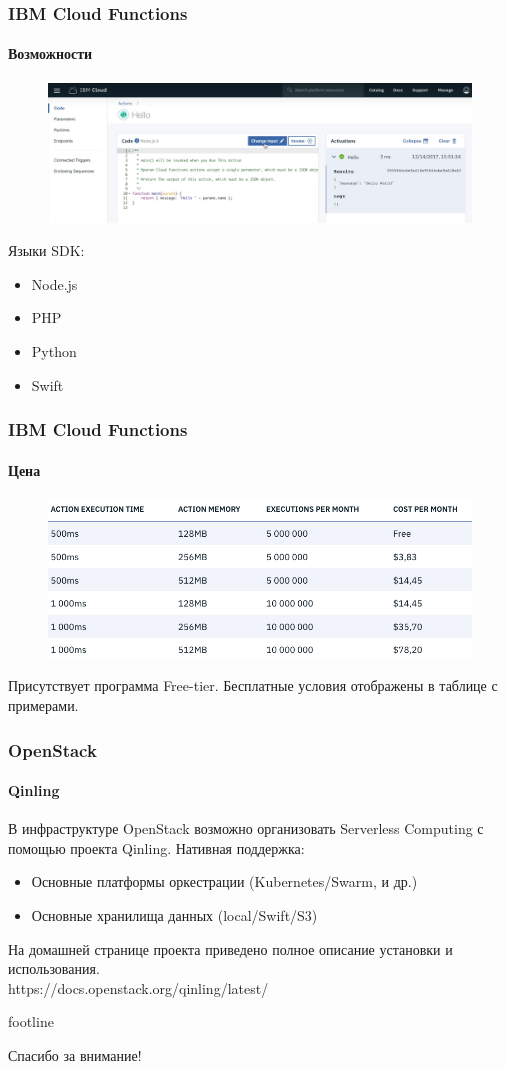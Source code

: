 \documentclass{beamer}
\begin{document}
    \begin{frame}
        \frametitle{IBM Cloud Functions}
        \framesubtitle{Возможности}
        \begin{figure}
            \includegraphics[width=1.05\linewidth]{images/ibmcloud}
        \end{figure}
        \vspace*{-0.5cm}
        Языки SDK:
        \begin{itemize}
            \item Node.js
            \item PHP
            \item Python
            \item Swift
        \end{itemize}
    \end{frame}


    \begin{frame}
        \frametitle{IBM Cloud Functions}
        \framesubtitle{Цена}
        \begin{figure}
            \includegraphics[width=\linewidth]{images/ibmprice}
        \end{figure}
        Присутствует программа Free-tier. Бесплатные условия отображены в таблице с примерами.
    \end{frame}


    \begin{frame}
        \frametitle{OpenStack}
        \framesubtitle{Qinling}
        В инфраструктуре OpenStack возможно организовать Serverless Computing с помощью проекта Qinling.
        \vspace*{0.5cm}
        Нативная поддержка:
        \begin{itemize}
            \item Основные платформы оркестрации (Kubernetes/Swarm, и др.)
            \item Основные хранилища данных (local/Swift/S3)
        \end{itemize}
        \vspace*{0.5cm}
        На домашней странице проекта приведено полное описание установки и использования.\\
        https://docs.openstack.org/qinling/latest/
    \end{frame}


    \begingroup
    \setbeamertemplate
    {footline}{}
    \begin{frame}
        \addtocounter{framenumber}{-1}
        \center
        \Large{Спасибо за внимание!}
    \end{frame}
    \endgroup
\end{document}
